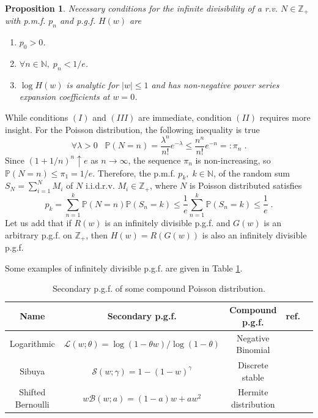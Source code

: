\documentclass[a4paper,12pt]{amsart}
\newcommand{\N}{\mathbb{N}}
\newcommand{\Z}{\mathbb{Z}_{+}}
\newcommand{\iid}{i.i.d.}
\newtheorem{Proposition}{Proposition}[section]
\theoremstyle{definition}
\theoremstyle{remark}
\begin{document}
\begin{Proposition} {\rm \cite{StvH2004}} \label{infd_nec}
Necessary conditions for the infinite divisibility of a r.v.  $N\in \Z $  with p.m.f. $p_n$ and p.g.f. $H(w)$ are
\begin{enumerate} 
\item $p_0 > 0$.
\item  $\forall n \in \N,\; p_n < 1/e $. 
\item $\log H(w)$ is analytic for $|w|\leq 1$ and has non-negative power series expansion coefficients at $w=0$. 
\end{enumerate}
\end{Proposition}
While conditions $(I)$ and  $(III)$ are immediate,  condition $(II)$ requires more insight\cite{StvH2004}. For the Poisson distribution, the following inequality is true 
\[ \forall \lambda>0 \;\;\; \mathbb{P}(N=n) = \frac{\lambda^n}{n!}e^{-\lambda}\leq \frac{n^n}{n!}e^{-n}=:\pi_n\;.
\]
Since $(1+1/n)^n \uparrow e$ as $n\to\infty$, the sequence $\pi_n$ is non-increasing, so $\mathbb{P}(N=n)\leq \pi_1=1/e$. Therefore, the p.m.f. $p_k,\; k\in \N$, of the random sum $S_N=\sum_{i=1}^N M_i$ of $N$ \iid{}r.v.  $M_i\in \Z$, where $N$ is Poisson distributed satisfies
\[
p_k=\sum_{n=1}^k \mathbb{P}(N=n)\mathbb{P}(S_n=k)\leq \frac{1}{e}\sum_{n=1}^k\mathbb{P}(S_n=k)\leq \frac{1}{e}\;.
\]
Let us add that if $R(w)$ is an infinitely divisible p.g.f. and $G(w)$ is an arbitrary p.g.f. on $\Z $, then $H(w)=R(G(w))$ is also an infinitely divisible p.g.f.

Some examples of infinitely divisible p.g.f. are given in Table \ref{tab:comppois}.

\begin{table}[h]
    \centering
    \begin{tabular}{|c|c|c|c|c|}
    \hline
         {\bf Name} & {\bf Secondary p.g.f.} & {\bf Compound p.g.f.} & {\bf ref.} \\
        \hline  \hline  
       Logarithmic & $\mathcal{L}(w;\theta)=\log(1-\theta w)/\log(1-\theta)$ & Negative Binomial & \cite{JKK2005}  \\
        \hline \hline
       Sibuya & $\mathcal{S}(w;\gamma)=1-(1- w)^{\gamma}$ & Discrete stable & \cite{StvH2004}  \\
         \hline \hline
       Shifted Bernoulli  & $w\mathcal{B}(w;a)=(1-a) w+ a w^2$ & Hermite distribution & \cite{JKK2005} \\
         \hline
    \end{tabular}
   \vspace{.2cm} \caption{Secondary p.g.f. of some compound Poisson distribution.}
    \label{tab:comppois}
\end{table}
\end{document}
